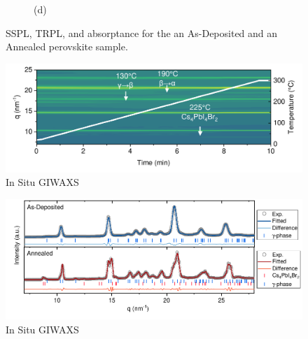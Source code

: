\begin{figure}[htbp]
\begin{subfigure}[t]{0.45\textwidth}
        \caption*{(d)}
    \end{subfigure}
    \caption{SSPL, TRPL, and absorptance for the an As-Deposited and an Annealed perovskite sample.}
\end{figure}


\begin{figure}
  \centering
  \medskip
  \includegraphics[width=\textwidth]{chapters/material_properties/images/GIWAXS_In_Situ.pdf}
  \caption[Short caption for Table of Figures]{In Situ GIWAXS}
  \label{}
\end{figure}

\begin{figure}
  \centering
  \medskip
  \includegraphics[width=\textwidth]{chapters/material_properties/images/GIWAXS_Before_After.pdf}
  \caption[Short caption for Table of Figures]{In Situ GIWAXS}
  \label{}
\end{figure}

